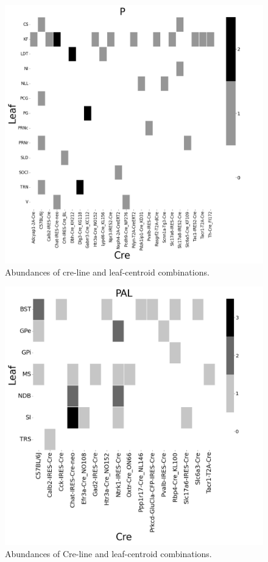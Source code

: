 \begin{figure}[H]
    \centering
    \includegraphics[width = 7in]{figs/P centroid density.png}
        \caption{Abundances of cre-line and leaf-centroid combinations.}
    \label{fig:my_label}
\end{figure}
\newpage

\begin{figure}[H]
    \centering
    \includegraphics[width = 7in]{figs/PAL centroid density.png} 
        \caption{Abundances of Cre-line and leaf-centroid combinations.}
    \label{fig:my_label}
\end{figure}
\newpage

